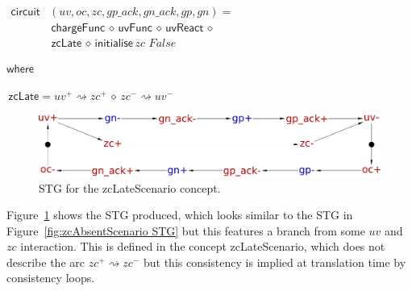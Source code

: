 \documentclass[british,compsoc]{IEEEtran}
\begin{document}
\begin{minipage}[t]{1\columnwidth}%
\begin{flushleft}
$\begin{aligned}\\\mathsf{circuit}&(uv, oc, zc, gp\_ack, gn\_ack, gp, gn) = \\
& \mathsf{\, chargeFunc}\,\diamond\,\mathsf{uvFunc}\,\diamond\,\mathsf{uvReact}\,\diamond\\
& \,\mathsf{zcLate}\,\diamond\,\mathsf{initialise}\,zc\,\,False
\end{aligned}
$
\par\end{flushleft}%

\par\begin{flushleft}
$\mathsf{where}$
\par\end{flushleft}

\begin{flushleft}
$\,\mathsf{zcLate}=uv^{+}\rightsquigarrow zc^{+}\,\diamond\, zc^{-}\rightsquigarrow uv^{-}$
\par\end{flushleft}

\end{minipage}

\begin{figure}[H]
\begin{centering}
\includegraphics[scale=0.22]{Images/stg-UV_before_ZC}
\par\end{centering}

\protect\caption{\label{fig:zcLateScenario STG}STG for the \textsf{zcLateScenario}
concept.}

\end{figure}

Figure~\ref{fig:zcLateScenario STG} shows the STG produced, which
looks similar to the STG in Figure~\ref{fig:zcAbsentScenario STG}
but this features a branch from some $uv$ and $zc$ interaction.
This is defined in the concept \textsf{zcLateScenario}, which does
not describe the arc $zc^{+}\rightsquigarrow zc^{-}$ but this consistency
is implied at translation time by consistency loops.
\end{document}
